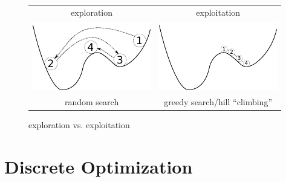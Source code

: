 \begin{frame}
\begin{figure}[ht]
  \begin{tabular}{c c}
		exploration & exploitation\\
      \includegraphics[height=3.0cm]{img/exploration.pdf} &
      \includegraphics[height=3.0cm]{img/exploitation.pdf}\\
      random search & greedy search/hill ``climbing''
      \end{tabular}
  \caption{exploration vs. exploitation}
  \label{fig:exploration-exploitation}
\end{figure}

\end{frame}


\section{Discrete Optimization}


